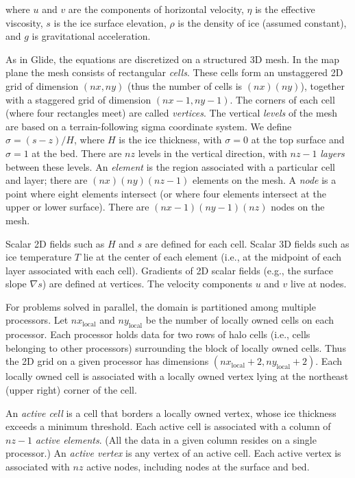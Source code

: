\noindent
where $u$ and $v$ are the components of horizontal velocity, $\eta$ is the effective viscosity, $s$ is the ice surface elevation,
$\rho$ is the density of ice (assumed constant), and $g$ is gravitational acceleration.  

As in Glide, the equations are discretized on a structured 3D mesh.
In the map plane the mesh consists of rectangular \textit{cells}. These cells form an unstaggered 2D grid 
of dimension $(nx,ny)$ (thus the number of cells is $(nx)(ny)$), together with a staggered grid of dimension $(nx-1,ny-1)$.
The corners of each cell (where four rectangles meet) are called \textit{vertices}.
The vertical \textit{levels} of the mesh are based on a terrain-following sigma coordinate system. 
We define $\sigma = (s-z)/H$, where $H$ is the ice thickness, with $\sigma = 0$ at the top surface and $\sigma = 1$ at the bed. 
There are $nz$ levels in the vertical direction, with $nz-1$ \textit{layers} between these levels.
An \textit{element} is the region associated with a particular cell and layer; there are
$(nx)(ny)(nz-1)$ elements on the mesh.  A \textit{node} is a point where eight elements intersect (or where four elements
intersect at the upper or lower surface). There are $(nx-1)(ny-1)(nz)$ nodes on the mesh.

Scalar 2D fields such as $H$ and $s$ are defined for each cell.
Scalar 3D fields such as ice temperature $T$ lie at the center of each element (i.e., at the midpoint of each layer
associated with  each cell). Gradients of 2D scalar fields (e.g., the surface slope $\nabla s$) are defined at vertices.
The velocity components $u$ and $v$ live at nodes.

For problems solved in parallel, the domain is partitioned among multiple processors.  
Let $nx_{\textrm{local}}$ and $ny_\textrm{{local}}$ be the
number of locally owned cells on each processor.  Each processor holds data for two rows of halo cells 
(i.e., cells belonging to other processors) surrounding the block of locally owned cells.
Thus the 2D grid on a given processor has dimensions $(nx_{\textrm{local}} + 2, ny_{\textrm{local}} + 2)$.
Each locally owned cell is associated with a locally owned vertex lying at the northeast (upper right) corner
of the cell.

An \textit{active cell} is a cell that borders a locally owned vertex, whose ice thickness exceeds a minimum threshold.  
Each active cell is associated with a column of $nz-1$ \textit{active elements}.  
(All the data in a given column resides on a single processor.)
An \textit{active vertex} is any vertex of an active cell.  Each active vertex is
associated with $nz$ active nodes, including nodes at the surface and bed.

